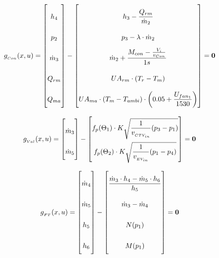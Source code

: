 \begin{equation} \label{eq:Gcondenser}\renewcommand{\arraystretch}{2.5}
	g_{_{Con}}(x,u) =  \begin{bmatrix}
		h_{4}				\\ %
		p_{2}				\\ %
		\dot{m}_{3}			\\ %
		Q_{rm}				\\
		Q_{ma}				\\
	\end{bmatrix}
	-
	\begin{bmatrix}
		h_{3} - \dfrac{Q_{rm}}{\dot{m}_{2}}	\\											%
		p_{3} - \lambda \cdot \dot{m}_{2}			\\									%
		\dot{m}_{2} + \dfrac{M_{con} - \frac{V_i}{v_{Con}}}{1s}	\\						%
		U A_{rm} \cdot (T_r - T_m) \\
		U A_{ma} \cdot (T_m - T_{ambi})\cdot \left(0.05 + \dfrac{U_{fan_1}}{1530}\right) \\
	\end{bmatrix}
	=\textbf{0}
\end{equation}




\begin{equation} \label{eq:Gvalves}\renewcommand{\arraystretch}{2.5}
	g_{_{Val}}(x,u) =  \begin{bmatrix}
		\dot{m}_{3}			\\ %

		\dot{m}_{5}			\\ %
	\end{bmatrix}
	-
	\begin{bmatrix}
		f_p(\Theta_1) \cdot K  \sqrt{\dfrac{1}{v_{_{CTV_{in}}}} (p_{3} - p_{1})}\\		%
		f_p(\Theta_2) \cdot K  \sqrt{\dfrac{1}{v_{_{EV_{in}}}} (p_{1} - p_{4})}\\			%
	\end{bmatrix}
	=\textbf{0}
\end{equation}

\begin{equation} \label{eq:Gflashtank}\renewcommand{\arraystretch}{2.5}
	g_{_{FT}}(x,u) =  \begin{bmatrix}
		\dot{m}_{4}			\\
		\dot{m}_{5}				\\
		h_{5}  \\
		h_{6} \\
	\end{bmatrix}
	-
	\begin{bmatrix}
		\dfrac{\dot{m}_{3} \cdot h_4 - \dot{m}_{5} \cdot h_6}{h_5}					\\
		\dot{m}_{3} - \dot{m}_{4}					\\
		N(p_1)\\
		M(p_1)\\
	\end{bmatrix}
	=\textbf{0}
\end{equation}



